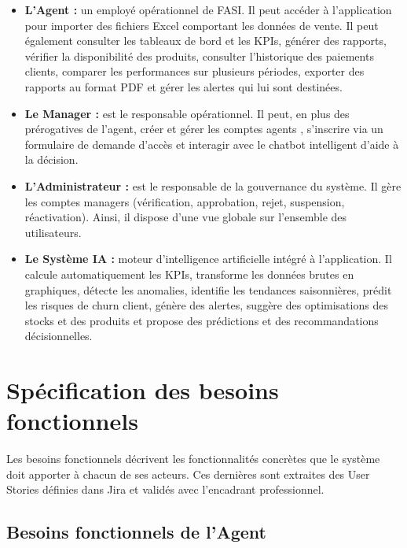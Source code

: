 \documentclass[a4paper,12pt]{report}
\begin{document}
\begin{itemize}

\item \textbf{L'Agent :} un employé opérationnel de FASI. Il peut accéder à l'application pour importer des fichiers Excel comportant les données de vente. Il peut également consulter les tableaux de bord et les KPIs, générer des rapports, vérifier la disponibilité des produits, consulter l'historique des paiements clients, comparer les performances sur plusieurs périodes, exporter des rapports au format PDF  et gérer les alertes qui lui sont destinées.

\item \textbf{Le Manager :} est le responsable opérationnel. Il peut, en plus des prérogatives de l'agent, créer et gérer les comptes agents , s'inscrire via un formulaire de demande d'accès et interagir avec le chatbot intelligent d'aide à la décision.

\item \textbf{L'Administrateur :} est le responsable de la gouvernance du système. Il gère les comptes managers (vérification, approbation, rejet, suspension, réactivation). Ainsi, il dispose d'une vue globale sur l'ensemble des utilisateurs.

\item \textbf{Le Système IA :} moteur d'intelligence artificielle intégré à l'application. Il calcule automatiquement les KPIs, transforme les données brutes en graphiques, détecte les anomalies, identifie les tendances saisonnières, prédit les risques de churn client, génère des alertes, suggère des optimisations des stocks et des produits et propose des prédictions et des recommandations décisionnelles.

\end{itemize}

\section{Spécification des besoins fonctionnels}

Les besoins fonctionnels décrivent les fonctionnalités concrètes que le système doit apporter à chacun de ses acteurs. Ces dernières sont extraites des User Stories définies dans Jira et validés avec l'encadrant professionnel.

\subsection{Besoins fonctionnels de l'Agent}
\end{document}
